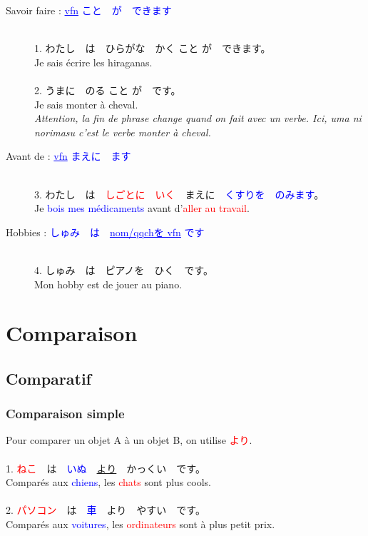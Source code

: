 \documentclass[11pt]{report}
\newenvironment{Japanese}{%
\CJKfamily{min}%
\CJKtilde  
\CJKnospace}{}
\begin{document}
\begin{CJK}{UTF8}{}  
\begin{Japanese}
	\begin{description}
		\item[Savoir faire : \textcolor{blue}{\underline{vfn} こと　が　できます}] \hfill \\
		1. わたし　は　ひらがな　かく こと が　できます。 \\
		Je sais écrire les hiraganas. \\ \\
		2. うまに　のる こと が　です。 \\
		Je sais monter \`a cheval. \\
		\emph{Attention, la fin de phrase change quand on fait avec un verbe. Ici, uma ni norimasu c'est le verbe monter à cheval.}
		\item[Avant de : \textcolor{blue}{\underline{vfn} まえに　\underline{\qquad}ます}] \hfill \\
		3. わたし　は　\textcolor{red}{しごとに　いく}　まえに　\textcolor{blue}{くすりを　のみます}。 \\
		Je \textcolor{blue}{bois mes médicaments} avant d'\textcolor{red}{aller au travail}.
		\item[Hobbies : \textcolor{blue}{しゅみ　は　\underline{nom/qqchを vfn} です}] \hfill \\
		4. しゅみ　は　ピアノを　ひく　です。 \\
		Mon hobby est de jouer au piano.
	\end{description}
\end{Japanese}  
\end{CJK}

\chapter{Comparaison}

\section{Comparatif}

\subsection{Comparaison simple}

\begin{CJK}{UTF8}{}  
\begin{Japanese}
	Pour comparer un objet A \`a un objet B, on utilise \textcolor{red}{より}. \\ \\
	1. \textcolor{red}{ねこ}　は　\textcolor{blue}{いぬ}　\underline{より}　かっくい　です。 \\
	Comparés aux \textcolor{blue}{chiens}, les \textcolor{red}{chats} sont plus cools. \\ \\
	2. \textcolor{red}{パソコン}　は　\textcolor{blue}{車}　より　やすい　です。 \\
	Comparés aux \textcolor{blue}{voitures}, les \textcolor{red}{ordinateurs} sont \`a plus petit prix.
\end{Japanese}  
\end{CJK}
\end{document}

